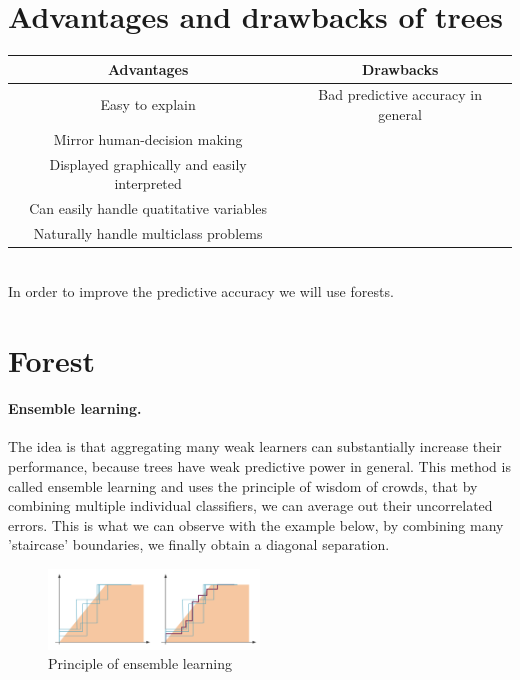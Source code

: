 \documentclass[a4paper,12pt]{article}
\begin{document}
\section{Advantages and drawbacks of trees}

\begin{tabular}{|c|c|}
  \hline
  Advantages & Drawbacks  \\
  \hline
  Easy to explain & Bad predictive accuracy in general  \\
  Mirror human-decision making & \\
  Displayed graphically and easily interpreted & \\
  Can easily handle quatitative variables & \\
  Naturally handle multiclass problems & \\
  \hline
  
\end{tabular}\\

In order to improve the predictive accuracy we will use forests. 

\newpage
\section{Forest}


\paragraph{Ensemble learning.}The idea is that aggregating many weak learners can substantially increase their performance, because trees have weak predictive power in general. This method is called ensemble learning and uses the principle of wisdom of crowds, that by combining multiple individual classifiers, we can average out their uncorrelated errors. This is what we can observe with the example below, by combining many 'staircase' boundaries, we finally obtain a diagonal separation. \\

\begin{figure}[h]
  \centering
  \includegraphics[width=0.5\textwidth]{figures/Staircase.png}
  \caption{Principle of ensemble learning}
  \label{fig:ensemble learning}
\end{figure}
\end{document}

